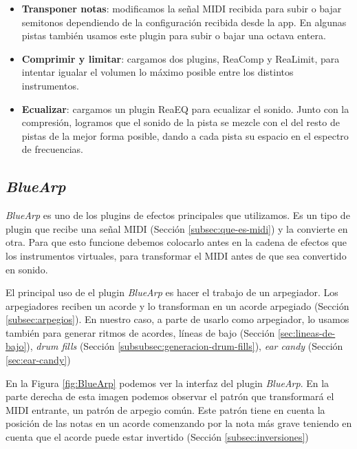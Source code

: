 \begin{itemize}
    \item \textbf{Transponer notas}: modificamos la señal MIDI recibida para subir o bajar semitonos dependiendo de la configuración recibida desde la app. En algunas pistas también usamos este plugin para subir o bajar una octava entera.

    \item \textbf{Comprimir y limitar}: cargamos dos plugins, ReaComp y ReaLimit, para intentar igualar el volumen lo máximo posible entre los distintos instrumentos.
    
    \item \textbf{Ecualizar}: cargamos un plugin ReaEQ para ecualizar el sonido. Junto con la compresión, logramos que el sonido de la pista se mezcle con el del resto de pistas de la mejor forma posible, dando a cada pista su espacio en el espectro de frecuencias.  
    
\end{itemize}



    \subsection{\textit{BlueArp}}\label{subsubsec:bluearp}
\textit{BlueArp} es uno de los plugins de efectos principales que utilizamos. Es un tipo de plugin que recibe una señal MIDI (Sección \ref{subsec:que-es-midi}) y la convierte en otra. Para que esto funcione debemos colocarlo antes en la cadena de efectos que los instrumentos virtuales, para transformar el MIDI antes de que sea convertido en sonido.

El principal uso de el plugin \textit{BlueArp} es hacer el trabajo de un arpegiador. Los arpegiadores reciben un acorde y lo transforman en un acorde arpegiado (Sección \ref{subsec:arpegios}). En nuestro caso, a parte de usarlo como arpegiador, lo usamos también para generar ritmos de acordes, líneas de bajo (Sección \ref{sec:lineas-de-bajo}), \textit{drum fills} (Sección \ref{subsubsec:generacion-drum-fills}), \textit{ear candy} (Sección \ref{sec:ear-candy})

En la Figura \ref{fig:BlueArp} podemos ver la interfaz del plugin \textit{BlueArp}. En la parte derecha de esta imagen podemos observar el patrón que transformará el MIDI entrante, un patrón de arpegio común. Este patrón tiene en cuenta la posición de las notas en un acorde comenzando por la nota más grave teniendo en cuenta que el acorde puede estar invertido (Sección \ref{subsec:inversiones})

